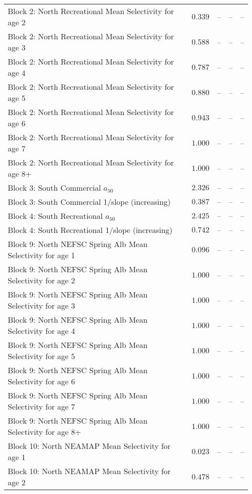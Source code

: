 \documentclass[
]{article}
\begin{document}
\begin{landscape}
\begin{longtable}[t]{lrrrr}
\addlinespace
Block 2: North Recreational Mean Selectivity for age 2 & $0.339$ & -- & -- & --\\
Block 2: North Recreational Mean Selectivity for age 3 & $0.588$ & -- & -- & --\\
Block 2: North Recreational Mean Selectivity for age 4 & $0.787$ & -- & -- & --\\
Block 2: North Recreational Mean Selectivity for age 5 & $0.880$ & -- & -- & --\\
Block 2: North Recreational Mean Selectivity for age 6 & $0.943$ & -- & -- & --\\
\addlinespace
Block 2: North Recreational Mean Selectivity for age 7 & $1.000$ & -- & -- & --\\
Block 2: North Recreational Mean Selectivity for age 8+ & $1.000$ & -- & -- & --\\
Block 3: South Commercial $a_{50}$ & $2.326$ & -- & -- & --\\
Block 3: South Commercial 1/slope (increasing) & $0.387$ & -- & -- & --\\
Block 4: South Recreational $a_{50}$ & $2.425$ & -- & -- & --\\
\addlinespace
Block 4: South Recreational 1/slope (increasing) & $0.742$ & -- & -- & --\\
Block 9: North NEFSC Spring Alb Mean Selectivity for age 1 & $0.096$ & -- & -- & --\\
Block 9: North NEFSC Spring Alb Mean Selectivity for age 2 & $1.000$ & -- & -- & --\\
Block 9: North NEFSC Spring Alb Mean Selectivity for age 3 & $1.000$ & -- & -- & --\\
Block 9: North NEFSC Spring Alb Mean Selectivity for age 4 & $1.000$ & -- & -- & --\\
\addlinespace
Block 9: North NEFSC Spring Alb Mean Selectivity for age 5 & $1.000$ & -- & -- & --\\
Block 9: North NEFSC Spring Alb Mean Selectivity for age 6 & $1.000$ & -- & -- & --\\
Block 9: North NEFSC Spring Alb Mean Selectivity for age 7 & $1.000$ & -- & -- & --\\
Block 9: North NEFSC Spring Alb Mean Selectivity for age 8+ & $1.000$ & -- & -- & --\\
Block 10: North NEAMAP Mean Selectivity for age 1 & $0.023$ & -- & -- & --\\
\addlinespace
Block 10: North NEAMAP Mean Selectivity for age 2 & $0.478$ & -- & -- & --\\

\end{longtable}
\end{landscape}
\end{document}
